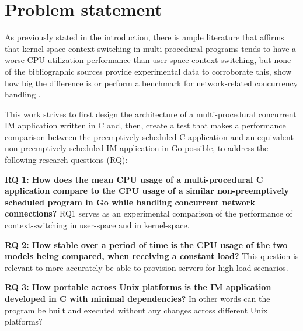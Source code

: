 \section{Problem statement}
As previously stated in the introduction, there is ample literature that affirms that kernel-space context-switching in multi-procedural programs tends to have a worse CPU utilization performance than user-space context-switching, but none of the bibliographic sources provide experimental data to corroborate this, show how big the difference is or perform a benchmark for network-related concurrency handling \cite{2003Events}\cite{2005Threads}\cite{2013ContextSwitching}\cite{Cox-Buday2017}\cite{Kerrisk2010}.

This work strives to first design the architecture of a multi-procedural concurrent IM application written in C and, then, create a test that makes a performance comparison between the preemptively scheduled C application and an equivalent non-preemptively scheduled IM application in Go possible, to address the following research questions (RQ):

\textbf{RQ 1: How does the mean CPU usage of a multi-procedural C application compare to the CPU usage of a similar non-preemptively scheduled program in Go while handling concurrent network connections?} RQ1 serves as an experimental comparison of the performance of context-switching in user-space and in kernel-space. 

\textbf{RQ 2: How stable over a period of time is the CPU usage of the two models being compared, when receiving a constant load?} This question is relevant to more accurately be able to provision servers for high load scenarios.

\textbf{RQ 3: How portable across Unix platforms is the IM application developed in C with minimal dependencies?} In other words can the program be built and executed without any changes across different Unix platforms?




